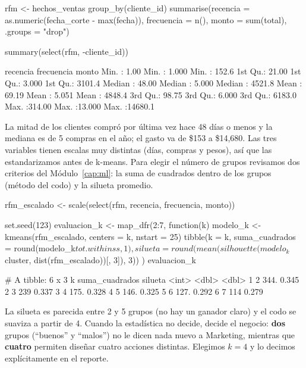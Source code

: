 \begin{rcode}
rfm <- hechos_ventas %
  group_by(cliente_id) %
  summarise(recencia   = as.numeric(fecha_corte - max(fecha)),
            frecuencia = n(),
            monto      = sum(total), .groups = "drop")

summary(select(rfm, -cliente_id))
\end{rcode}

\begin{rsalida}
    recencia        frecuencia         monto        
 Min.   :  1.00   Min.   : 1.000   Min.   :  152.6  
 1st Qu.: 21.00   1st Qu.: 3.000   1st Qu.: 3101.4  
 Median : 48.00   Median : 5.000   Median : 4521.8  
 Mean   : 69.19   Mean   : 5.051   Mean   : 4848.4  
 3rd Qu.: 98.75   3rd Qu.: 6.000   3rd Qu.: 6183.0  
 Max.   :314.00   Max.   :13.000   Max.   :14680.1  
\end{rsalida}

La mitad de los clientes compró por última vez hace 48 días o menos y la
mediana es de 5 compras en el año; el gasto va de \$153 a \$14,680. Las tres
variables tienen escalas muy distintas (días, compras y pesos), así
que las estandarizamos antes de k-means. Para elegir el número de grupos
revisamos dos criterios del Módulo~\ref{cap:ml}: la suma de cuadrados dentro
de los grupos (método del codo) y la silueta promedio.

\begin{rcode}
rfm_escalado <- scale(select(rfm, recencia, frecuencia, monto))

set.seed(123)
evaluacion_k <- map_dfr(2:7, function(k) {
  modelo_k <- kmeans(rfm_escalado, centers = k, nstart = 25)
  tibble(k = k,
         suma_cuadrados = round(modelo_k$tot.withinss, 1),
         silueta = round(mean(silhouette(modelo_k$cluster,
                                         dist(rfm_escalado))[, 3]), 3))
})
evaluacion_k
\end{rcode}

\begin{rsalida}
# A tibble: 6 x 3
      k suma_cuadrados silueta
  <int>          <dbl>   <dbl>
1     2           344.   0.345
2     3           239    0.337
3     4           175.   0.328
4     5           146.   0.325
5     6           127.   0.292
6     7           114    0.279
\end{rsalida}

La silueta es parecida entre 2 y 5 grupos (no hay un ganador claro) y el codo
se suaviza a partir de 4. Cuando la estadística no decide, decide el negocio:
\textbf{dos} grupos (``buenos'' y ``malos'') no le dicen nada nuevo a
Marketing, mientras que \textbf{cuatro} permiten diseñar cuatro acciones
distintas. Elegimos $k = 4$ y lo decimos explícitamente en el reporte.

